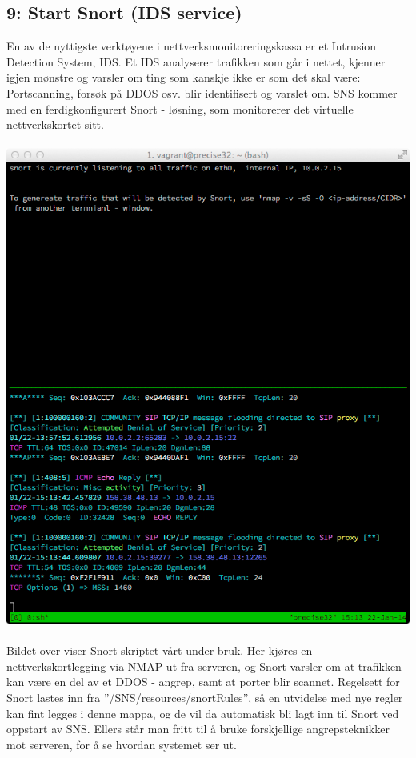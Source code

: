 \documentclass{article}
\begin{document}
\subsection{9: Start Snort (IDS service)}
En av de nyttigste verktøyene i nettverksmonitoreringskassa er et Intrusion Detection System, IDS. Et IDS analyserer trafikken som går i nettet, kjenner igjen mønstre og varsler om ting som kanskje ikke er som det skal være: Portscanning, forsøk på DDOS osv. blir identifisert og varslet om. SNS kommer med en ferdigkonfigurert Snort - løsning, som monitorerer det virtuelle nettverkskortet sitt.
\\
\\
\includegraphics[scale = 0.7]{pictures/snort.png}
\\
\\
Bildet over viser Snort skriptet vårt under bruk. Her kjøres en nettverkskortlegging via NMAP ut fra serveren, og Snort varsler om at trafikken kan være en del av et DDOS - angrep, samt at porter blir scannet. Regelsett for Snort lastes inn fra ''/SNS/resources/snortRules'', så en utvidelse med nye regler kan fint legges i denne mappa, og de vil da automatisk bli lagt inn til Snort ved oppstart av SNS. Ellers står man fritt til å bruke forskjellige angrepsteknikker mot serveren, for å se hvordan systemet ser ut. 
\end{document}
